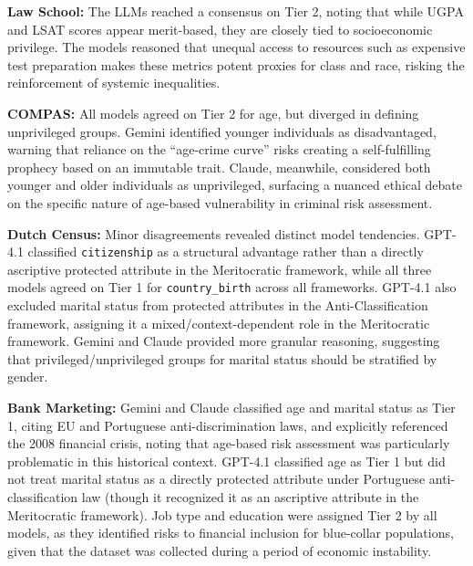 \begin{table}[htbp]
\begin{threeparttable}
\caption{Validation of LLM-derived fairness context against academic literature~\cite{le2022survey, coraglia2024evaluating, kartalmitigating}.  Due to high cross-model consistency, we present a single \textbf{LLM Consensus} column. T1 denotes strongly protected attributes, and T2 denotes context-dependent. Minor variations are noted below.}
\label{tab:llm_validation}

\begin{tablenotes}

    \item[a] \textbf{Law School:} The LLMs reached a consensus on Tier 2, noting that while UGPA and LSAT scores appear merit-based, they are closely tied to socioeconomic privilege. The models reasoned that unequal access to resources such as expensive test preparation makes these metrics potent proxies for class and race, risking the reinforcement of systemic inequalities.

    \item[b] \textbf{COMPAS:} All models agreed on Tier 2 for age, but diverged in defining unprivileged groups. Gemini identified younger individuals as disadvantaged, warning that reliance on the ``age-crime curve'' risks creating a self-fulfilling prophecy based on an immutable trait. Claude, meanwhile, considered both younger and older individuals as unprivileged, surfacing a nuanced ethical debate on the specific nature of age-based vulnerability in criminal risk assessment.

    \item[c] \textbf{Dutch Census:} Minor disagreements revealed distinct model tendencies. GPT-4.1 classified \texttt{citizenship} as a structural advantage rather than a directly ascriptive protected attribute in the Meritocratic framework, while all three models agreed on Tier 1 for \texttt{country\_birth} across all frameworks. GPT-4.1 also excluded marital status from protected attributes in the Anti-Classification framework, assigning it a mixed/context-dependent role in the Meritocratic framework. Gemini and Claude provided more granular reasoning, suggesting that privileged/unprivileged groups for marital status should be stratified by gender.

    \item[d] \textbf{Bank Marketing:} Gemini and Claude classified age and marital status as Tier 1, citing EU and Portuguese anti-discrimination laws, and explicitly referenced the 2008 financial crisis, noting that age-based risk assessment was particularly problematic in this historical context. GPT-4.1 classified age as Tier 1 but did not treat marital status as a directly protected attribute under Portuguese anti-classification law (though it recognized it as an ascriptive attribute in the Meritocratic framework). Job type and education were assigned Tier 2 by all models, as they identified risks to financial inclusion for blue-collar populations, given that the dataset was collected during a period of economic instability.

\end{tablenotes}
\end{threeparttable}
\end{table}
